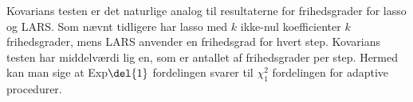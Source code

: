 
Kovarians testen er det naturlige analog til resultaterne for frihedsgrader for lasso og LARS.
Som nævnt tidligere har lasso med \(k\) ikke-nul koefficienter \(k\) frihedsgrader, mens LARS anvender en frihedsgrad for hvert step.
Kovarians testen har middelværdi lig en, som er antallet af frihedsgrader per step.
Hermed kan man sige at Exp\(\del{1}\) fordelingen svarer til \(\chi_1^2\) fordelingen for adaptive procedurer.

%
